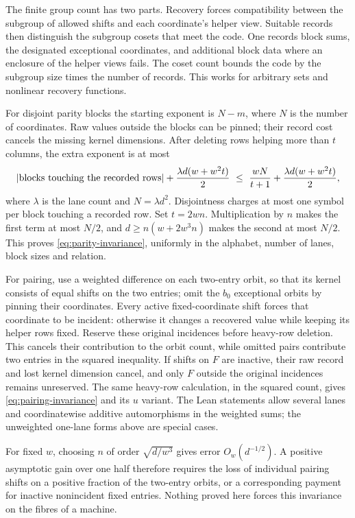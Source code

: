\begin{outline}
The finite group count has two parts. Recovery forces compatibility between the subgroup of allowed shifts and
each coordinate's helper view. Suitable records then distinguish the subgroup cosets that meet the code. One
records block sums, the designated exceptional coordinates, and additional block data where an enclosure of the
helper views fails. The coset count bounds the code by the subgroup size times the number of records. This works
for arbitrary sets and nonlinear recovery functions.

For disjoint parity blocks the starting exponent is $N-m$, where $N$ is the number of coordinates. Raw values
outside the blocks can be pinned; their record cost cancels the missing kernel dimensions. After deleting rows
helping more than $t$ columns, the extra exponent is at most
\[
 \lvert \text{blocks touching the recorded rows} \rvert+
       \frac{\lambda d(w+w^2t)}2
 \ \le\ \frac{wN}{t+1}+\frac{\lambda d(w+w^2t)}2,
\]
where $\lambda$ is the lane count and $N=\lambda d^2$. Disjointness charges at most one symbol per block touching
a recorded row. Set $t=2wn$. Multiplication by $n$ makes the first term at most $N/2$, and
$d\ge n(w+2w^3n)$ makes the second at most $N/2$. This proves \eqref{eq:parity-invariance}, uniformly in the
alphabet, number of lanes, block sizes and relation.

For pairing, use a weighted difference on each two-entry orbit, so that its kernel consists of equal shifts on
the two entries; omit the $b_0$ exceptional orbits by pinning their coordinates. Every active fixed-coordinate
shift forces that coordinate to be incident: otherwise it changes a recovered value while keeping its helper rows
fixed. Reserve these original incidences before heavy-row deletion. This cancels their contribution to the orbit
count, while omitted pairs contribute two entries in the squared inequality. If shifts on $F$ are inactive, their
raw record and lost kernel dimension cancel, and only $F$ outside the original incidences remains unreserved.
The same heavy-row calculation, in the squared count, gives \eqref{eq:pairing-invariance} and its $u$ variant.
The Lean statements allow several lanes and coordinatewise additive automorphisms in the weighted sums; the
unweighted one-lane forms above are special cases.
\end{outline}

For fixed $w$, choosing $n$ of order $\sqrt{d/w^3}$ gives error $O_w(d^{-1/2})$. A positive asymptotic gain over
one half therefore requires the loss of individual pairing shifts on a positive fraction of the two-entry orbits,
or a corresponding payment for inactive nonincident fixed entries. Nothing proved here forces this invariance on
the fibres of a machine.

